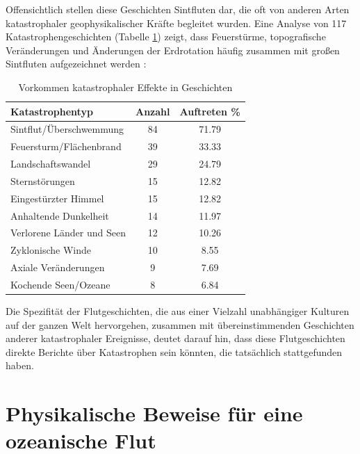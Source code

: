 \documentclass[10pt,twocolumn,letterpaper]{article}
\begin{document}
Offensichtlich stellen diese Geschichten Sintfluten dar, die oft von anderen Arten katastrophaler geophysikalischer Kräfte begleitet wurden. Eine Analyse von 117 Katastrophengeschichten (Tabelle \ref{tab: 1}) zeigt, dass Feuerstürme, topografische Veränderungen und Änderungen der Erdrotation häufig zusammen mit großen Sintfluten aufgezeichnet werden \cite{14}:

\begin{table}[ht]
\begin{center}
\renewcommand{\arraystretch}{1.2}  %
\begin{tabular}{|l|c|c|}
\hline
\textbf{Katastrophentyp} & \textbf{Anzahl} & \textbf{Auftreten \%} \\
\hline\hline
Sintflut/Überschwemmung   & 84 & 71.79 \\
Feuersturm/Flächenbrand   & 39 & 33.33 \\
Landschaftswandel & 29 & 24.79 \\
Sternstörungen            & 15 & 12.82 \\
Eingestürzter Himmel      & 15 & 12.82 \\
Anhaltende Dunkelheit     & 14 & 11.97 \\
Verlorene Länder und Seen & 12 & 10.26 \\
Zyklonische Winde         & 10 & 8.55  \\
Axiale Veränderungen & 9 & 7.69  \\
Kochende Seen/Ozeane & 8 & 6.84 \\
\hline
\end{tabular}
\end{center}
\caption{Vorkommen katastrophaler Effekte in Geschichten}
\label{tab: 1}
\end{table}

Die Spezifität der Flutgeschichten, die aus einer Vielzahl unabhängiger Kulturen auf der ganzen Welt hervorgehen, zusammen mit übereinstimmenden Geschichten anderer katastrophaler Ereignisse, deutet darauf hin, dass diese Flutgeschichten direkte Berichte über Katastrophen sein könnten, die tatsächlich stattgefunden haben.

\section{Physikalische Beweise für eine ozeanische Flut}
\end{document}
